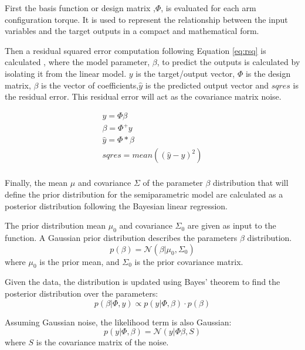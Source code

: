 First the basis function or design matrix ,$\Phi$, is evaluated for each arm configuration torque. It is used to represent the relationship between the input variables and the target outputs in a compact and mathematical form. 

Then a residual squared error computation following Equation \ref{eq:rsq} is calculated , where the model parameter, $\beta$, to predict the outputs is calculated by isolating it from the linear model. \( y \) is the target/output vector, \( \Phi \) is the design matrix, \( \beta \) is the vector of coefficients,\( \hat{y} \) is the predicted output vector and  \( sqres \) is the residual error. This residual error will act as the covariance matrix noise.

\begin{equation}
\begin{aligned}
    y = \Phi \beta \\
    \beta = \Phi^+y \\
    \hat{y} = \Phi*\beta \\
    sqres = mean((\hat{y}-y)^2) \\
\end{aligned}
\end{equation} \label{eq:rsq}

Finally, the mean \( \mu \) and covariance \( \Sigma \) of the parameter $\beta$ distribution  that will define the prior distribution for the semiparametric model are calculated as a posterior distribution following the Bayesian linear regression.  

The prior distribution mean \( \mu_0 \) and covariance \( \Sigma_0 \) are given as input to the function. A Gaussian prior distribution describes the parameters \( \beta \) distribution.
\begin{equation}
  p(\beta) = \mathcal{N}(\beta | \mu_0, \Sigma_0)
\end{equation}
where \( \mu_0 \) is the prior mean, and \( \Sigma_0 \) is the prior covariance matrix.

Given the data, the distribution is updated using Bayes' theorem to find the posterior distribution over the parameters:
\begin{equation}
    p(\beta | \Phi, y) \propto p(y | \Phi, \beta) \cdot p(\beta)
\end{equation}

Assuming Gaussian noise, the likelihood term is also Gaussian:
\begin{equation}
  p(y | \Phi, \beta) = \mathcal{N}(y | \Phi \beta, S)
\end{equation}
where \( S \) is the covariance matrix of the noise.


